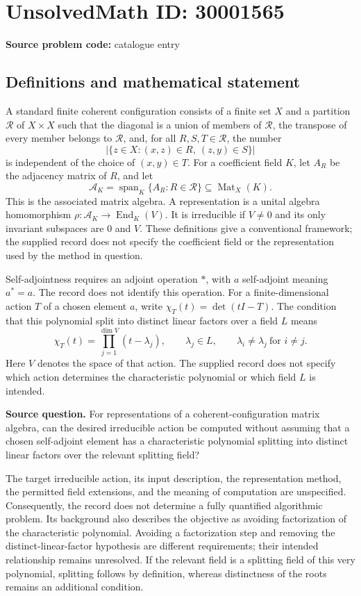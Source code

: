 \documentclass[11pt]{article}
\begin{document}
\section*{UnsolvedMath ID: 30001565}
\textbf{Source problem code:} catalogue entry
\subsection{Definitions and mathematical statement}
A standard finite coherent configuration consists of a finite set \(X\) and a partition \(\mathcal R\) of \(X\times X\) such that the diagonal is a union of members of \(\mathcal R\), the transpose of every member belongs to \(\mathcal R\), and, for all \(R,S,T\in\mathcal R\), the number
\[
\bigl|\{z\in X:(x,z)\in R,\ (z,y)\in S\}\bigr|
\]
is independent of the choice of \((x,y)\in T\). For a coefficient field \(K\), let \(A_R\) be the adjacency matrix of \(R\), and let
\[
\mathcal A_K=\operatorname{span}_K\{A_R:R\in\mathcal R\}\subseteq\operatorname{Mat}_X(K).
\]
This is the associated matrix algebra. A representation is a unital algebra homomorphism \(\rho:\mathcal A_K\to\operatorname{End}_K(V)\). It is irreducible if \(V\ne0\) and its only invariant subspaces are \(0\) and \(V\). These definitions give a conventional framework; the supplied record does not specify the coefficient field or the representation used by the method in question.

Self-adjointness requires an adjoint operation \(*\), with \(a\) self-adjoint meaning \(a^*=a\). The record does not identify this operation. For a finite-dimensional action \(T\) of a chosen element \(a\), write \(\chi_T(t)=\det(tI-T)\). The condition that this polynomial split into distinct linear factors over a field \(L\) means
\[
\chi_T(t)=\prod_{j=1}^{\dim V}(t-\lambda_j),\qquad
\lambda_j\in L,\qquad \lambda_i\ne\lambda_j\ \text{for }i\ne j.
\]
Here \(V\) denotes the space of that action. The supplied record does not specify which action determines the characteristic polynomial or which field \(L\) is intended.

\textbf{Source question.} For representations of a coherent-configuration matrix algebra, can the desired irreducible action be computed without assuming that a chosen self-adjoint element has a characteristic polynomial splitting into distinct linear factors over the relevant splitting field?

The target irreducible action, its input description, the representation method, the permitted field extensions, and the meaning of computation are unspecified. Consequently, the record does not determine a fully quantified algorithmic problem. Its background also describes the objective as avoiding factorization of the characteristic polynomial. Avoiding a factorization step and removing the distinct-linear-factor hypothesis are different requirements; their intended relationship remains unresolved. If the relevant field is a splitting field of this very polynomial, splitting follows by definition, whereas distinctness of the roots remains an additional condition.
\end{document}
